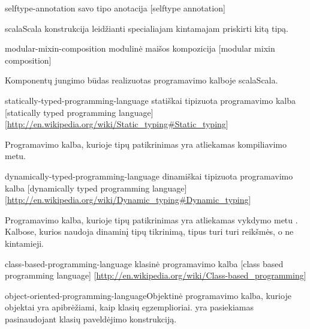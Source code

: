 \begin{glossary}
  \begin{entry}%
    {selftype-annotation}%
    {savo tipo anotacija}%
    [selftype annotation]

    \gls{scala}{Scala} konstrukcija leidžianti specialiajam kintamajam
     priskirti kitą tipą.

  \end{entry}

  \begin{entry}%
    {modular-mixin-composition}%
    {modulinė maišos kompozicija}%
    [modular mixin composition]

    Komponentų jungimo būdas realizuotas programavimo kalboje
    \gls{scala}{Scala}.
    
  \end{entry}

  \begin{entry}%
    {statically-typed-programming-language}%
    {statiškai tipizuota programavimo kalba}%
    [statically typed programming language]%
    [\url{http://en.wikipedia.org/wiki/Static_typing\#Static_typing}]

    Programavimo kalba, kurioje tipų patikrinimas yra atliekamas
    kompiliavimo metu.\cite[2]{Madsen:1990:STO:97946.97964}
    
  \end{entry}

  \begin{entry}%
    {dynamically-typed-programming-language}%
    {dinamiškai tipizuota programavimo kalba}%
    [dynamically typed programming language]%
    [\url{http://en.wikipedia.org/wiki/Dynamic_typing\#Dynamic_typing}]

    Programavimo kalba, kurioje tipų patikrinimas yra atliekamas vykdymo
    metu \cite[2]{Madsen:1990:STO:97946.97964}. Kalbose, kurios naudoja
    dinaminį tipų tikrinimą, tipus turi turi reikšmės, o ne kintamieji.
    
  \end{entry}

  \begin{entry}%
    {class-based-programming-language}%
    {klasinė programavimo kalba}%
    [class based programming language]%
    [\url{http://en.wikipedia.org/wiki/Class-based_programming}]

    \gls{object-oriented-programming-language}{Objektinė programavimo
    kalba}, kurioje objektai yra apibrėžiami,
    kaip klasių egzemplioriai.  yra pasiekiamas
    pasinaudojant klasių paveldėjimo konstrukciją.


\end{entry}
\end{glossary}
